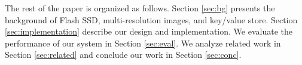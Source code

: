 

The rest of the paper is organized as follows. Section \ref{sec:bg}
presents the background of Flash SSD, multi-resolution images, and
key/value store. Section \ref{sec:implementation} describe our design
and implementation.
We evaluate the performance of our system in Section \ref{sec:eval}.
We analyze related work in Section \ref{sec:related} and conclude our
work in Section \ref{sec:conc}.


